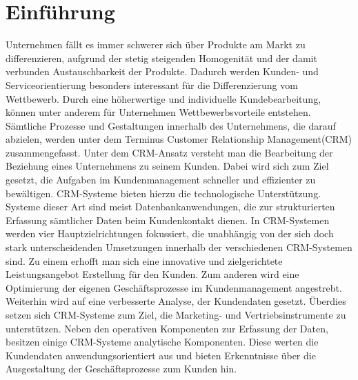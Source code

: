 
\chapter{Einführung}

Unternehmen fällt es immer schwerer sich über Produkte am Markt zu differenzieren, aufgrund der stetig steigenden Homogenität und der damit verbunden Austauschbarkeit der Produkte. Dadurch werden Kunden- und Serviceorientierung besonders interessant für die Differenzierung vom Wettbewerb. Durch eine höherwertige und individuelle Kundebearbeitung, können unter anderem für Unternehmen Wettbewerbsvorteile entstehen. Sämtliche Prozesse und Gestaltungen innerhalb des Unternehmens, die darauf abzielen, werden unter dem Terminus Customer Relationship Management(CRM) zusammengefasst. Unter dem CRM-Ansatz versteht man die Bearbeitung der Beziehung eines Unternehmens zu seinem Kunden. Dabei wird sich zum Ziel gesetzt, die Aufgaben im Kundenmanagement schneller und effizienter zu bewältigen. CRM-Systeme bieten hierzu die technologische Unterstützung. Systeme dieser Art sind meist Datenbankanwendungen, die zur strukturierten Erfassung sämtlicher Daten beim Kundenkontakt dienen. In CRM-Systemen werden vier Hauptzielrichtungen fokussiert, die unabhängig von der sich doch stark unterscheidenden Umsetzungen innerhalb der verschiedenen CRM-Systemen sind. Zu einem erhofft man sich eine innovative und zielgerichtete Leistungsangebot Erstellung für den Kunden. Zum anderen wird eine Optimierung der eigenen Geschäftsprozesse im Kundenmanagement angestrebt. Weiterhin wird auf eine verbesserte Analyse, der Kundendaten gesetzt. Überdies setzen sich CRM-Systeme zum Ziel, die Marketing- und Vertriebsinstrumente zu unterstützen. Neben den operativen Komponenten zur Erfassung der Daten, besitzen einige CRM-Systeme analytische Komponenten. Diese werten die Kundendaten anwendungsorientiert aus und bieten Erkenntnisse über die Ausgestaltung der Geschäftsprozesse zum Kunden hin.

